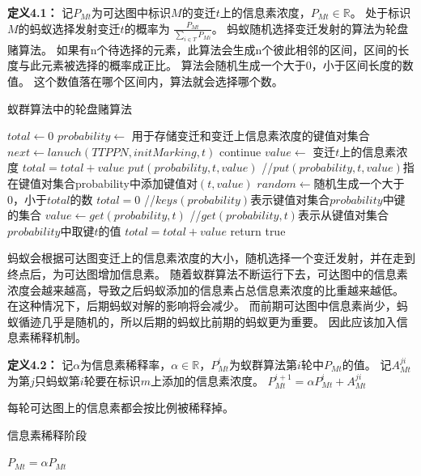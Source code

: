 \textbf{定义4.1}\textbf{：}
记$P_{Mt}$为可达图中标识$M$的变迁$t$上的信息素浓度，$P_{Mt}\in \mathbb{R}$。
处于标识$M$的蚂蚁选择发射变迁$t$的概率为
$
	\frac{P_{Mt}}{\sum_{i \in T} P_{Mi} }
$。
蚂蚁随机选择变迁发射的算法为轮盘赌算法。
如果有n个待选择的元素，此算法会生成n个彼此相邻的区间，区间的长度与此元素被选择的概率成正比。
算法会随机生成一个大于0，小于区间长度的数值。
这个数值落在哪个区间内，算法就会选择哪个数。

\begin{algorithm}[H]
	\caption{蚁群算法中的轮盘赌算法}
	\label{alg4-5}
	\begin{algorithmic}
		\State $total \leftarrow 0$
		\State $probability \leftarrow $ 用于存储变迁和变迁上信息素浓度的键值对集合
		\State 
				\State $next \leftarrow lanuch(TTPPN,initMarking,t)$
					\State continue
				\EndIf
				\State $value \leftarrow$ 变迁$t$上的信息素浓度
				\State $total=total+value$
				\State $put(probability,t,value)$ //$put(probability,t,value)$指在键值对集合probability中添加键值对$(t,value)$
			\EndIf
		\EndFor
		\State $random \leftarrow $随机生成一个大于0，小于$total$的数
		\State $total=0$
		 //$keys(probability)$表示键值对集合$probability$中键的集合
			\State $value \leftarrow get(probability,t)$ //$get(probability,t)$表示从键值对集合$probability$中取键$t$的值
			\State $total=total+value$
				\State return true
			\EndIf
		\EndFor
		\EndProcedure
	\end{algorithmic}
\end{algorithm}

蚂蚁会根据可达图变迁上的信息素浓度的大小，随机选择一个变迁发射，并在走到终点后，为可达图增加信息素。
随着蚁群算法不断运行下去，可达图中的信息素浓度会越来越高，导致之后蚂蚁添加的信息素占总信息素浓度的比重越来越低。
在这种情况下，后期蚂蚁对解的影响将会减少。
而前期可达图中信息素尚少，蚂蚁循迹几乎是随机的，所以后期的蚂蚁比前期的蚂蚁更为重要。
因此应该加入信息素稀释机制。

\textbf{定义4.2}\textbf{：}
记$\alpha $为信息素稀释率，$\alpha \in \mathbb{R}$，$P_{Mt}^{i}$为蚁群算法第$i$轮中$P_{Mt}$的值。
记$A_{Mt}^{ji}$为第$j$只蚂蚁第$i$轮要在标识$m$上添加的信息素浓度。
$P_{Mt}^{i+1}=\alpha P_{Mt}^{i}+A_{Mt}^{ji}$

每轮可达图上的信息素都会按比例被稀释掉。
\begin{algorithm}[H]
	\caption{信息素稀释阶段}
	\label{alg4-6}
	\begin{algorithmic}
		\Procedure {dilute}{$RG$}
			\ForAll{$M \in RG$}
				\ForAll{$t \in T$}
					\State $P_{Mt}=\alpha P_{Mt}$
				\EndFor
			\EndFor
		\EndProcedure
	\end{algorithmic}
\end{algorithm}

